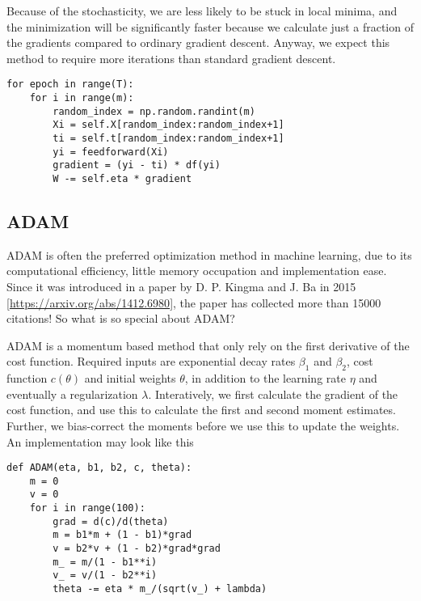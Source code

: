 Because of the stochasticity, we are less likely to be stuck in local minima, and the minimization will be significantly faster because we calculate just a fraction of the gradients compared to ordinary gradient descent. Anyway, we expect this method to require more iterations than standard gradient descent.
\lstset{basicstyle=\scriptsize}
\begin{lstlisting}
for epoch in range(T):
	for i in range(m):
		random_index = np.random.randint(m)
		Xi = self.X[random_index:random_index+1]
		ti = self.t[random_index:random_index+1]
		yi = feedforward(Xi)
		gradient = (yi - ti) * df(yi)
		W -= self.eta * gradient
\end{lstlisting}

\subsection{ADAM}
ADAM is often the preferred optimization method in machine learning, due to its computational efficiency, little memory occupation and implementation ease. Since it was introduced in a paper by D. P. Kingma and J. Ba in 2015 [\url{https://arxiv.org/abs/1412.6980}], the paper has collected more than 15000 citations! So what is so special about ADAM?

ADAM is a momentum based method that only rely on the first derivative of the cost function. Required inputs are exponential decay rates $\beta_1$ and $\beta_2$, cost function $c(\theta)$ and initial weights $\theta$, in addition to the learning rate $\eta$ and eventually a regularization $\lambda$. Interatively, we first calculate the gradient of the cost function, and use this to calculate the first and second moment estimates. Further, we bias-correct the moments before we use this to update the weights. An implementation may look like this
\lstset{basicstyle=\scriptsize}
\begin{lstlisting}
def ADAM(eta, b1, b2, c, theta):
    m = 0
    v = 0
    for i in range(100):
        grad = d(c)/d(theta)
        m = b1*m + (1 - b1)*grad
        v = b2*v + (1 - b2)*grad*grad
        m_ = m/(1 - b1**i)
        v_ = v/(1 - b2**i)
        theta -= eta * m_/(sqrt(v_) + lambda)
\end{lstlisting}
